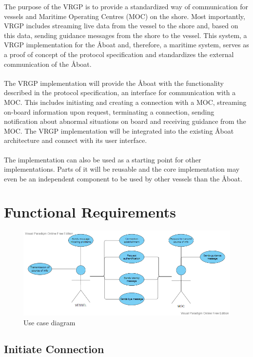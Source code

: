 The purpose of the VRGP is to provide a standardized way of communication for vessels and Maritime Operating Centres (MOC) on the shore. Most importantly, VRGP includes streaming live data from the vessel to the shore and, based on this data, sending guidance messages from the shore to the vessel. This system, a VRGP implementation for the Åboat and, therefore, a maritime system, serves as a proof of concept of the protocol specification and standardizes the external communication of the Åboat.
\\\\
The VRGP implementation will provide the Åboat with the functionality described in the protocol specification, an interface for communication with a MOC. This includes initiating and creating a connection with a MOC, streaming on-board information upon request, terminating a connection, sending notification about abnormal situations on board and receiving guidance from the MOC. The VRGP implementation will be integrated into the existing Åboat architecture and connect with its user interface.
\\\\
The implementation can also be used as a starting point for other implementations. Parts of it will be reusable and the core implementation may even be an independent component to be used by other vessels than the Åboat.

\section{Functional Requirements}\label{sec:func-requirements}

\begin{figure}[ht]
	\centering
	\includegraphics[width=\linewidth]{uml/use-case-diagram}
	\caption{Use case diagram}
	\label{fig:use-case-diagram}
\end{figure}

\subsection{Initiate Connection}

